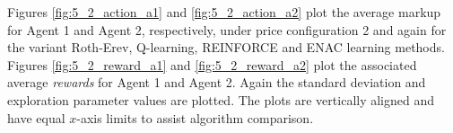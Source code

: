 Figures \ref{fig:5_2_action_a1} and \ref{fig:5_2_action_a2} plot the average
markup for Agent 1 and Agent 2, respectively, under price
configuration 2 and again for the variant Roth-Erev, Q-learning, REINFORCE and
ENAC learning methods.  Figures \ref{fig:5_2_reward_a1} and
\ref{fig:5_2_reward_a2} plot the associated average \textit{rewards} for
Agent 1 and Agent 2.  Again the standard deviation and exploration parameter
values are plotted. The plots are vertically aligned and have equal $x$-axis
limits to assist algorithm comparison.
